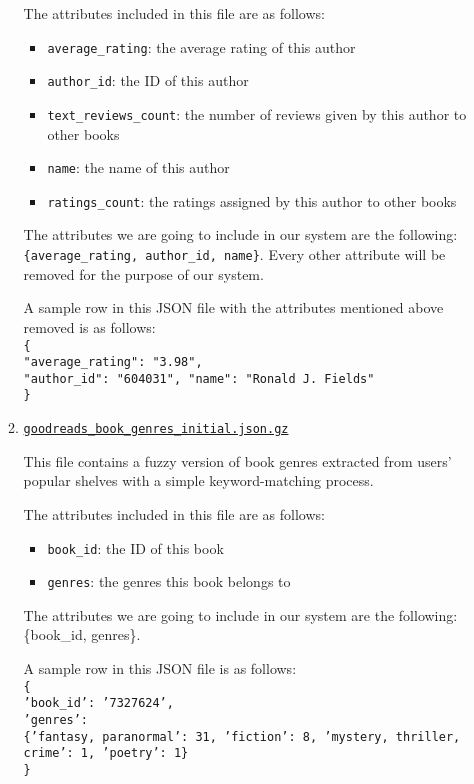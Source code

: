 \documentclass[fontsize=11pt]{article}
\begin{document}
\begin{itemize}
\begin{enumerate}
The attributes included in this file are as follows:
\begin{itemize}
  \item \texttt{average\_rating}: the average rating of this author
  \item \texttt{author\_id}: the ID of this author
  \item \texttt{text\_reviews\_count}: the number of reviews given by this author to other books
  \item \texttt{name}: the name of this author
  \item \texttt{ratings\_count}: the ratings assigned by this author to other books
\end{itemize}
The attributes we are going to include in our system are the following:
\texttt{\{average\_rating, author\_id, name\}}. Every other attribute will be removed for the purpose of our system.
 
A sample row in this JSON file with the attributes mentioned above removed is as follows: \\
\texttt{\{\\
"average\_rating": "3.98", \\
"author\_id": "604031",
"name": "Ronald J. Fields"\\
\}} \\
 
\item \texttt{\href{https://drive.google.com/uc?id=1ah0_KpUterVi-AHxJ03iKD6O0NfbK0md}{goodreads\_book\_genres\_initial.json.gz}}
 
This file contains a fuzzy version of book genres extracted from users’ popular shelves with a simple keyword-matching process.
 
The attributes included in this file are as follows:
\begin{itemize}
  \item \texttt{book\_id}: the ID of this book
  \item \texttt{genres}: the genres this book belongs to
\end{itemize}
The attributes we are going to include in our system are the following:
\{book\_id, genres\}.
 
A sample row in this JSON file is as follows: \\
\texttt{\{\\
'book\_id': '7327624',\\
'genres': \\
\{'fantasy, paranormal': 31, 'fiction': 8, 'mystery, thriller, crime': 1, 'poetry': 1\}\\
\}}
\end{enumerate}


\end{itemize}
\end{document}
